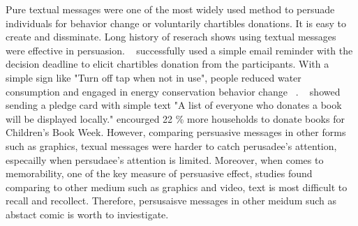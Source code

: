 Pure textual messages were one of the most widely used method to persuade individuals for behavior change or voluntarily chartibles donations. It is easy to create and dissminate. Long history of reserach shows using textual messages were effective in persuasion. ~\textcite{damgaard2017now} successfully used a simple email reminder with the decision deadline to elicit chartibles donation from the participants. With a simple sign like "Turn off tap when not in use", people reduced water consumption and engaged in energy conservation behavior change ~\cite{mckenzie2011fostering}. ~\textcite{cotterill2010impact} showed sending a pledge card with simple text "A list of everyone who donates a book will be displayed locally." encourged 22 \% more households to donate books for Children's Book Week. However, comparing persuasive messages in other forms such as graphics, texual messages were harder to catch perusadee's attention, especailly when persudaee's attention is limited. Moreover, when comes to memorability, one of the key measure of persuasive effect, studies found comparing to other medium such as graphics and video, text is most difficult to recall and recollect. Therefore, persusaisve messages in other meidum such as abstact comic is worth to inviestigate. 

